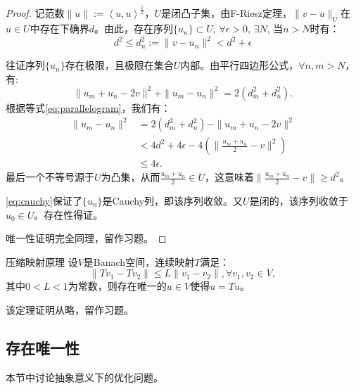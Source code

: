 \documentclass[lang=cn,10pt,newtx]{elegantbook}
\newcommand{\innerprod}[2]{\left<#1,#2\right>}
\newcommand{\norm}[1]{\|#1\|}
\begin{document}
\begin{proof}
  记范数$\norm{u}:=\innerprod{u}{u}^{\frac{1}{2}}$，$U$是闭凸子集，由F-Riesz定理，$\norm{v-u}_{U}$在$u\in U$中存在下确界$d$。由此，存在序列$\{u_{n}\}\subset U$, $\forall\epsilon>0$, $\exists N$, 当$n>N$时有：
  \begin{equation}
    \label{eq:cauchyseq}
    d^2\le d_{n}^{2}:=\norm{v-u_{n}}^{2}<d^2+\epsilon
  \end{equation}

  往证序列$\{u_{n}\}$存在极限，且极限在集合$U$内部。由平行四边形公式，$\forall n,m>N$，有:
  \begin{equation}
    \label{eq:parallelogram}
    \norm{u_{m}+u_{n}-2v}^{2}+\norm{u_{m}-u_{n}}^{2}=2(d_{m}^{2}+d_{n}^{2}).
  \end{equation}
  根据等式\eqref{eq:parallelogram}，我们有：
  \begin{equation}
    \label{eq:cauchy}
    \begin{aligned}
      \norm{u_{m}-u_{n}}^{2}&=2(d_{m}^2+d_{n}^2)-\norm{u_{m}+u_{n}-2v}^2\\
      &< 4d^2+4\epsilon -4(\norm{\frac{u_{m}+u_{n}}{2}-v}^2)\\
      &\le 4\epsilon.
    \end{aligned}
  \end{equation}
  最后一个不等号源于$U$为凸集，从而$\frac{u_{m}+u_{n}}{2}\in U$，这意味着$\norm{\frac{u_{m}+u_{n}}{2}-v}\ge d^2$。

  \eqref{eq:cauchy}保证了$\{u_{n}\}$是Cauchy列，即该序列收敛。又$U$是闭的，该序列收敛于$u_{0}\in U$。存在性得证。

  唯一性证明完全同理，留作习题。
\end{proof}
\begin{proposition}{压缩映射原理}
  设$V$是Banach空间，连续映射$T$满足：
  \begin{equation}
    \norm{Tv_{1}-Tv_{2}}\le L\norm{v_{1}-v_{2}},\forall v_{1},v_{2}\in V,
  \end{equation}
  其中$0<L<1$为常数，则存在唯一的$u\in V$使得$u=Tu$。
\end{proposition}
该定理证明从略，留作习题。
\subsection{存在唯一性}
本节中讨论抽象意义下的优化问题。
\end{document}
